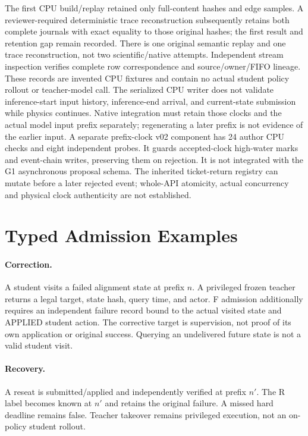 \documentclass{article}
\begin{document}
The first CPU build/replay retained only full-content hashes and edge samples. A reviewer-required deterministic trace reconstruction subsequently retains both complete journals with exact equality to those original hashes; the first result and retention gap remain recorded. There is one original semantic replay and one trace reconstruction, not two scientific/native attempts. Independent stream inspection verifies complete row correspondence and source/owner/FIFO lineage. These records are invented CPU fixtures and contain no actual student policy rollout or teacher-model call. The serialized CPU writer does not validate inference-start input history, inference-end arrival, and current-state submission while physics continues. Native integration must retain those clocks and the actual model input prefix separately; regenerating a later prefix is not evidence of the earlier input. A separate prefix-clock v02 component has 24 author CPU checks and eight independent probes. It guards accepted-clock high-water marks and event-chain writes, preserving them on rejection. It is not integrated with the G1 asynchronous proposal schema. The inherited ticket-return registry can mutate before a later rejected event; whole-API atomicity, actual concurrency and physical clock authenticity are not established.

\section{Typed Admission Examples}
\paragraph{Correction.} A student visits a failed alignment state at prefix $n$. A privileged frozen teacher returns a legal target, state hash, query time, and actor. F admission additionally requires an independent failure record bound to the actual visited state and APPLIED student action. The corrective target is supervision, not proof of its own application or original success. Querying an undelivered future state is not a valid student visit.
\paragraph{Recovery.} A reseat is submitted/applied and independently verified at prefix $n'$. The R label becomes known at $n'$ and retains the original failure. A missed hard deadline remains false. Teacher takeover remains privileged execution, not an on-policy student rollout.
\end{document}
